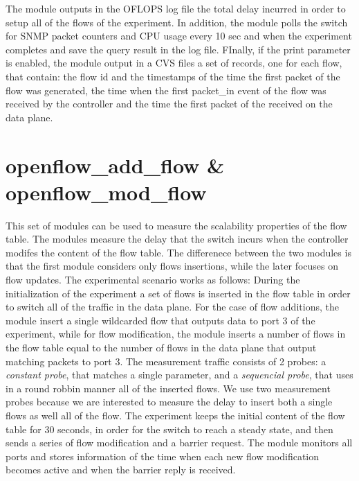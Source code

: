 \documentclass{book}
\begin{document}
The module outputs in the OFLOPS log file the total delay incurred in order to
setup all of the flows of the experiment. In addition, the module polls the 
switch for SNMP packet counters and CPU usage every 10 sec and when the experiment 
completes and save the query result in the log file. FInally, if the print 
parameter is enabled, the module output in a CVS files a set of 
records,  one for each flow, that contain: the flow id and the timestamps of the time the first
packet of the flow was generated, the time when the first packet\_in event of
the flow was received by the controller and the time the first packet of the
received on the data plane. 

\section{openflow\_add\_flow  \& openflow\_mod\_flow}

This set of modules can be used to measure the scalability properties of the flow
table. The modules measure the delay that the switch incurs when the controller
modifes the content of the flow table. The differenece between the two modules is that the first
module considers only flows insertions, while the later focuses on flow updates.
The experimental scenario works as follows: During the initialization of the
experiment a set of flows is inserted in the flow table in order to switch all
of the traffic in the data plane. For the case of flow additions, the module
insert a single wildcarded flow that outputs data to port 3 of the 
experiment, while for flow modification, the module inserts a number of flows in the flow
table equal to the number of flows in the data plane that output matching
packets to port 3. The measurement traffic consists of 2 probes: a \emph{constant probe}, that
matches a single parameter, and a \emph{sequencial probe}, that uses in a round
robbin manner all of the inserted flows. We use two measurement probes
because we are interested to measure the delay to insert both a single flows as
well all of the flow. The experiment keeps the initial content of the flow table 
for 30 seconds, in order for the switch to reach a
steady state, and then sends a series of flow modification and a barrier
request. The module monitors all ports and stores information of the time 
when each new flow modification becomes active and when the barrier reply is
received. 
\end{document}
